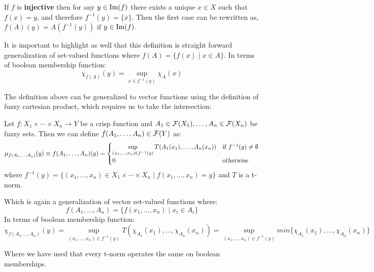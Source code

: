 \begin{remark}
  If $f$ is \textbf{injective} then for any $y \in \textnormal{Im}(f)$ there exists a unique $x \in X$ such that $f(x)=y$, and therefore $f^{-1}(y)=\{x\}$. Then the first case can be rewritten as, $f(A)(y) = A(f^{-1}(y))$ if $y \in \textnormal{Im}(f)$.
\end{remark}

It is important to highlight as well that this definition is straight forward generalization of set-valued functions where $f(A)= \{f(x)\mid x\in A\}$. In terms of boolean membership function:
$$\chi _{f(A)}(y)=\sup_{x\in f^{-1}(y)}\chi_A(x)$$

The definition above can be generalized to vector functions using the definition of fuzzy cartesian product, which requires us to take the intersection:

\begin{definition}
  Let $f: X_1 \times \cdots \times X_n \longrightarrow Y$ be a crisp function and $A_1 \in \mathcal{F}(X_1), \ldots, A_n \in \mathcal{F}(X_n)$ be fuzzy sets. Then we can define $f(A_1,\ldots,A_n)\in \mathcal{F}(Y)$ as:
  \[
  \mu_{f(A_1,\ldots,A_n)}(y)\equiv f(A_1,\ldots,A_n)(y) = 
  \begin{cases}
    \sup_{(x_1,\ldots,x_n)\in f^{-1}(y)} T(A_1(x_1),\ldots,A_n(x_n)) & \textnormal{if } f^{-1}(y)\neq \emptyset\\
    0 & \textnormal{otherwise}
  \end{cases}
  \]
  where $f^{-1}(y)=\{(x_1,\ldots,x_n)\in X_1\times\cdots\times X_n \mid f(x_1,\ldots,x_n)=y\}$ and $T$ is a t-norm.
\end{definition}

Which is again a generalization of vector set-valued functions where: $$f(A_1,\ldots,A_n)= \{f(x_1,\ldots,x_n)\mid x_i\in A_i\}$$
In terms of boolean membership function:
$$\chi _{f(A_1,\ldots,A_n)}(y)=\sup_{(x_1,\ldots,x_n)\in f^{-1}(y)}T(\chi_{A_1}(x_1),\ldots,\chi_{A_n}(x_n)) = \sup_{(x_1,\ldots,x_n)\in f^{-1}(y)}min\{\chi_{A_1}(x_1),\ldots,\chi_{A_n}(x_n)\}$$

Where we have used that every t-norm operates the same on boolean memberships. \\

